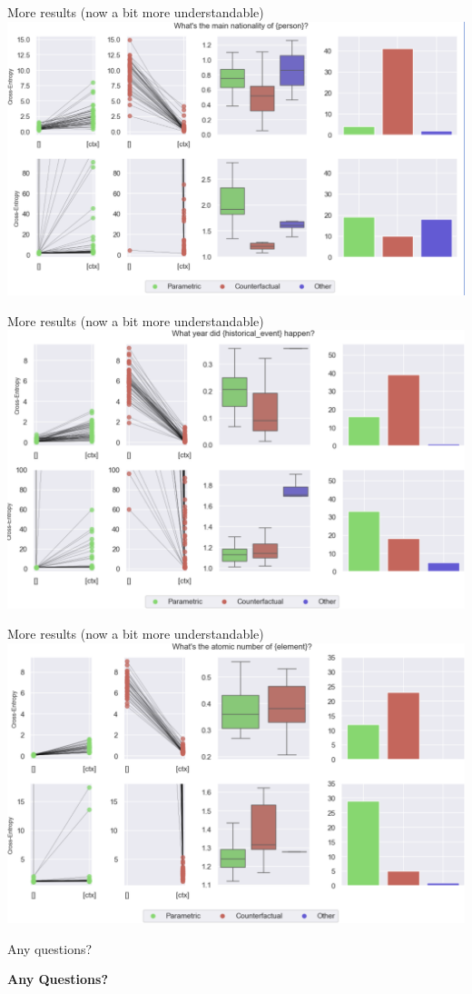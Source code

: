 \documentclass[9pt]{beamer}
\begin{document}
\begin{frame}{More results (now a bit more understandable)}
	\centering
	\includegraphics[width=\textwidth]{whats_the_main_nationality_of.png}
\end{frame}

\begin{frame}{More results (now a bit more understandable)}
	\centering
	\includegraphics[width=\textwidth]{when_did_event_happen.png}
\end{frame}

\begin{frame}{More results (now a bit more understandable)}
	\centering
	\includegraphics[width=\textwidth]{whats_the_atomic_number_of.png}
\end{frame}

\begin{frame}{Any questions?}
	\begin{Huge}
		\bfseries
		\centering
		Any Questions?
	\end{Huge}
\end{frame}
\end{document}
